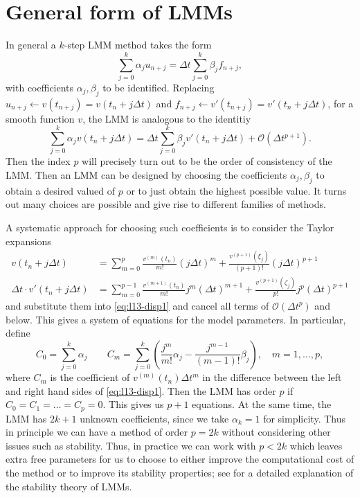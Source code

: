 \chapter{General form of LMMs}


In general a $k$-step LMM method takes the form 
\begin{equation*}
    \sum_{j=0}^k \alpha_j u_{n+j} = \Delta t \sum_{j=0}^k \beta_j f_{n+j},
\end{equation*} 
with coefficients $\alpha_j, \beta_j$ to be identified. 
Replacing $u_{n+j} \leftarrow v(t_{n+j}) = v(t_n + j \Delta t)$ and $f_{n+j} \leftarrow
v'(t_{n+j}) = v'(t_{n} + j \Delta t)$, for a smooth function $v$,
 the LMM is analogous to the identitiy 
\begin{equation}\label{eq:l13-disp1}
    \sum_{j=0}^k \alpha_j v(t_{n} + j \Delta t) 
    = \Delta t \sum_{j=0}^k \beta_j v'(t_{n} + j \Delta t) + \mathcal{O}(\Delta t^{p+1}).
\end{equation}
Then the index $p$ will precisely turn out to be the order of 
consistency of the LMM. Then an LMM can be designed by choosing the 
coefficients $\alpha_j, \beta_j$ to obtain a desired valued of $p$ 
or to just obtain the highest possible value. It turns out many choices 
are possible and give rise to different families of methods. 

A systematic approach for choosing such coefficients is to consider 
the Taylor expansions 
\begin{equation*}
    \begin{aligned}
        v(t_n + j \Delta t) & = \sum_{m=0}^p \frac{v^{(m)}(t_n)}{m!} 
    (j \Delta t)^m + \frac{v^{(p+1)}(\xi_j)}{(p+1)!} 
    (j \Delta t)^{p+1} \\
       \Delta t \cdot v'(t_n + j \Delta t) 
       &= \sum_{m=0}^{p-1} 
       \frac{v^{(m+1)}(t_n)}{m!} 
    j^m (\Delta t)^{m+1} + \frac{v^{(p+1)}(\zeta_j)}{p!} 
    j^{p} (\Delta t)^{p+1} 
    \end{aligned}
\end{equation*}
and substitute them into \eqref{eq:l13-disp1} and 
cancel all terms of  $\mathcal{O}(\Delta t^p)$ and below. 
This gives a system of equations for the model parameters.  
In particular, define
\begin{equation*}
    C_0 = \sum_{j=0}^k \alpha_j 
    \qquad 
    C_m = \sum_{j=0}^k \left( \frac{j^m}{m!} \alpha_j
    - \frac{j^{m-1}}{(m-1)!} \beta_j \right),
    \quad m = 1, \dots, p,
\end{equation*}
where $C_m$ is the coefficient of $v^{(m)}(t_n) \Delta t^m$ in the
difference between the left and right hand sides of
\eqref{eq:l13-disp1}. Then the 
LMM has order $p$ if $C_0 = C_1 = \dots = C_p = 0$. This gives us 
$p+1$ equations. At the same time, the LMM has $2k + 1$ unknown coefficients, 
since we take $\alpha_k = 1$ for simplicity. Thus in principle 
we can have a method of order $p=2k$ without considering other 
issues such as stability. Thus, in practice we can work with $p < 2k$ 
which leaves extra free parameters for us to choose to either 
improve the computational cost of the method or to improve its stability 
properties; see \cite{griffiths2010numerical} for a detailed explanation of 
the stability theory of LMMs.

